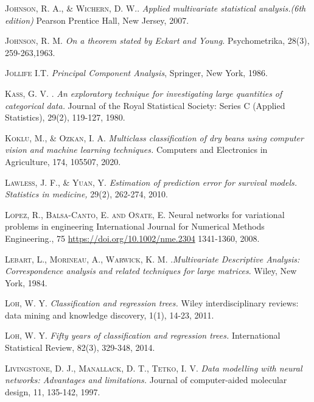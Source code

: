 \begin{thebibliography}{99}
\textsc{Johnson, R. A., \& Wichern, D. W.}. \emph{Applied multivariate statistical analysis.(6th edition)} Pearson Prentice Hall, New Jersey, 2007.

 \textsc{Johnson, R. M. } \emph{On a theorem stated by Eckart and Young.} Psychometrika, 28(3), 259-263,1963.

 \textsc{Jollife I.T}. \emph{Principal Component Analysis}, Springer, New York, 1986.



\textsc{Kass, G. V. }. \emph{An exploratory technique for investigating large quantities of categorical data.} Journal of the Royal Statistical Society: Series C (Applied Statistics), 29(2), 119-127, 1980.


\textsc{Koklu, M., \& Ozkan, I. A.} \emph{Multiclass classification of dry beans using computer vision and machine learning techniques.} Computers and Electronics in Agriculture, 174, 105507, 2020.

 \textsc{Lawless, J. F., \& Yuan, Y.} \emph{Estimation of prediction error for survival models.} \emph{Statistics in medicine,} 29(2), 262-274, 2010.

 \textsc{Lopez, R., Balsa-Canto, E. and Oñate, E. }  Neural networks for variational problems in engineering International Journal for Numerical Methods Engineering., 75 \url{https://doi.org/10.1002/nme.2304} 1341-1360, 2008.

\textsc{Lebart, L., Morineau, A.,  Warwick, K. M. }.\textit{Multivariate Descriptive Analysis: Correspondence analysis and related techniques for large matrices}. Wiley, New York, 1984.

\textsc{Loh, W. Y. } \emph{Classification and regression trees.} Wiley interdisciplinary reviews: data mining and knowledge discovery, 1(1), 14-23, 2011.

\textsc{Loh, W. Y. } \emph{Fifty years of classification and regression trees.} International Statistical Review, 82(3), 329-348, 2014.

\textsc{Livingstone, D. J., Manallack, D. T., Tetko, I. V. } \emph{Data modelling with neural networks: Advantages and limitations.} Journal of computer-aided molecular design, 11, 135-142, 1997.


\end{thebibliography}
